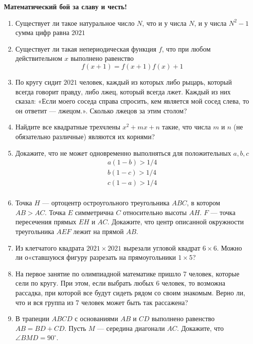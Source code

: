 \documentclass{article}
\begin{document}
    \large

    \begin{center}
        \textbf{Математический бой за славу и честь!}
    \end{center}

    \begin{enumerate}[label*=\arabic{enumi}.]

        \item Существует ли такое натуральное число $N$, что и у числа $N$, и у числа $N^2 - 1$ сумма цифр равна $2021$

        \item Существует ли такая непериодическая функция $f$, что при любом действительном $x$ выполнено равенство \[f (x + 1) = f (x + 1)f (x) + 1\]

        \item По кругу сидит $2021$ человек, каждый из которых либо рыцарь, который всегда говорит правду, либо лжец, который всегда лжет.
        Каждый из них сказал: «Если моего соседа справа спросить, кем является мой сосед слева, то он ответит — лжецом.». Сколько лжецов за этим столом?

        \item Найдите все квадратные трехчлены $x^2 + mx + n$ такие, что числа $m$ и $n$ (не обязательно различные) являются их корнями?

        \item Докажите, что не может одновременно выполняться для положительных $a,b,c$
        \begin{gather*}
            a(1-b)>1/4\\
            b(1-c)>1/4\\
            c(1-a)>1/4\\
        \end{gather*}

        \item Точка $H$ — ортоцентр остроугольного треугольника $ABC$, в котором $AB > AC$.
        Точка $E$ симметрична $C$ относительно высоты $AH$. $F$ — точка пересечения прямых $EH$ и $AC$.
        Докажите, что центр описанной окружности треугольника $AEF$ лежит на прямой $AB$.

        \item Из клетчатого квадрата $2021 \times 2021$ вырезали угловой квадрат $6 \times 6$.
        Можно ли о«ставшуюся фигуру разрезать на прямоугольники $1 \times 5$?

        \item На первое занятие по олимпиадной математике пришло 7 человек, которые сели по кругу.
        При этом, если выбрать любых 6 человек, то возможна рассадка, при которой все будут сидеть рядом со своим знакомым.
        Верно ли, что и вся группа из 7 человек может быть так рассажена?

        \item В трапеции $ABCD$ с основаниями $AB$ и $CD$ выполнено равенство $AB = BD + CD$.
        Пусть $M$ — середина диагонали $AC$.
        Докажите, что $\angle BMD = 90^\circ$.

    \end{enumerate}
\end{document}
